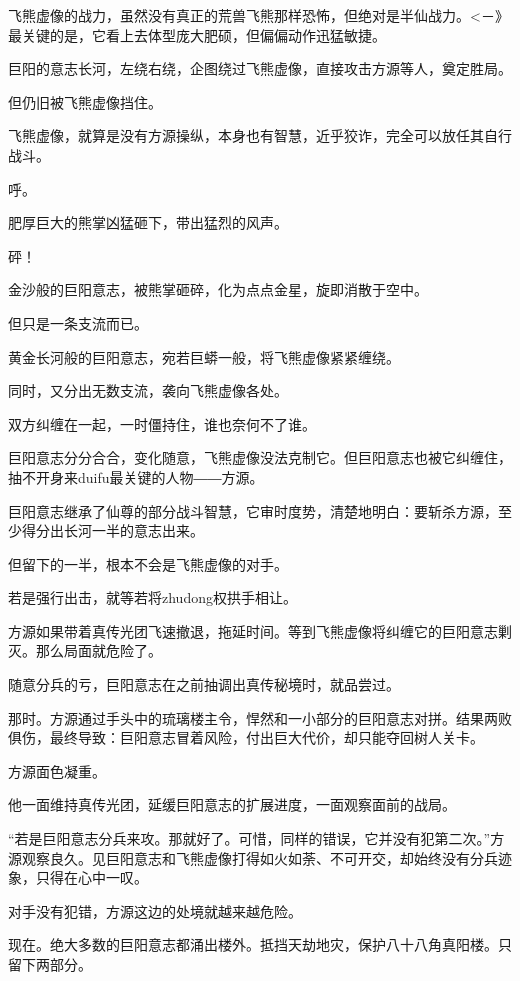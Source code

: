 
\begin{this_body}

飞熊虚像的战力，虽然没有真正的荒兽飞熊那样恐怖，但绝对是半仙战力。<－》最关键的是，它看上去体型庞大肥硕，但偏偏动作迅猛敏捷。

巨阳的意志长河，左绕右绕，企图绕过飞熊虚像，直接攻击方源等人，奠定胜局。

但仍旧被飞熊虚像挡住。

飞熊虚像，就算是没有方源操纵，本身也有智慧，近乎狡诈，完全可以放任其自行战斗。

呼。

肥厚巨大的熊掌凶猛砸下，带出猛烈的风声。

砰！

金沙般的巨阳意志，被熊掌砸碎，化为点点金星，旋即消散于空中。

但只是一条支流而已。

黄金长河般的巨阳意志，宛若巨蟒一般，将飞熊虚像紧紧缠绕。

同时，又分出无数支流，袭向飞熊虚像各处。

双方纠缠在一起，一时僵持住，谁也奈何不了谁。

巨阳意志分分合合，变化随意，飞熊虚像没法克制它。但巨阳意志也被它纠缠住，抽不开身来duifu最关键的人物――方源。

巨阳意志继承了仙尊的部分战斗智慧，它审时度势，清楚地明白：要斩杀方源，至少得分出长河一半的意志出来。

但留下的一半，根本不会是飞熊虚像的对手。

若是强行出击，就等若将zhudong权拱手相让。

方源如果带着真传光团飞速撤退，拖延时间。等到飞熊虚像将纠缠它的巨阳意志剿灭。那么局面就危险了。

随意分兵的亏，巨阳意志在之前抽调出真传秘境时，就品尝过。

那时。方源通过手头中的琉璃楼主令，悍然和一小部分的巨阳意志对拼。结果两败俱伤，最终导致：巨阳意志冒着风险，付出巨大代价，却只能夺回树人关卡。

方源面色凝重。

他一面维持真传光团，延缓巨阳意志的扩展进度，一面观察面前的战局。

“若是巨阳意志分兵来攻。那就好了。可惜，同样的错误，它并没有犯第二次。”方源观察良久。见巨阳意志和飞熊虚像打得如火如荼、不可开交，却始终没有分兵迹象，只得在心中一叹。

对手没有犯错，方源这边的处境就越来越危险。

现在。绝大多数的巨阳意志都涌出楼外。抵挡天劫地灾，保护八十八角真阳楼。只留下两部分。


\end{this_body}

